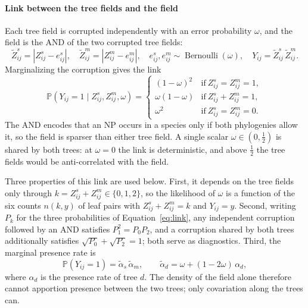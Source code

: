 \documentclass[
11pt, %
oneside, %
english, %
singlespacing, %
headsepline, %
chapterinoneline, %
]{MastersDoctoralThesis} %
\DeclareMathOperator{\Bernoulli}{Bernoulli}
\def\P{\mathbb{P}}
\begin{document}
\paragraph{Link between the tree fields and the field} Each tree field is corrupted independently with an error probability $\omega$, and the field is the AND of the two corrupted tree fields:
\begin{equation*}
	\tilde Z^s_{ij} = |Z^s_{ij} - e^s_{ij}|,\quad \tilde Z^m_{ij} = |Z^m_{ij} - e^m_{ij}|,\quad e^s_{ij}, e^m_{ij} \sim \Bernoulli(\omega),\quad Y_{ij} = \tilde Z^s_{ij}\, \tilde Z^m_{ij}.
\end{equation*}
Marginalizing the corruption gives the link
\begin{equation}
	\label{eq:link}
	\P(Y_{ij}=1 \mid Z^s_{ij}, Z^m_{ij}, \omega) =
	\begin{cases}
		(1-\omega)^2      & \mathrm{if\ } Z^s_{ij} = Z^m_{ij} = 1, \\
		\omega(1-\omega)  & \mathrm{if\ } Z^s_{ij} + Z^m_{ij} = 1, \\
		\omega^2          & \mathrm{if\ } Z^s_{ij} = Z^m_{ij} = 0.
	\end{cases}
\end{equation}
The AND encodes that an NP occurs in a species only if both phylogenies allow it, so the field is sparser than either tree field. A single scalar $\omega \in (0, \tfrac12)$ is shared by both trees: at $\omega=0$ the link is deterministic, and above $\tfrac12$ the tree fields would be anti-correlated with the field.

Three properties of this link are used below. First, it depends on the tree fields only through $k = Z^s_{ij} + Z^m_{ij} \in \{0,1,2\}$, so the likelihood of $\omega$ is a function of the six counts $n(k,y)$ of leaf pairs with $Z^s_{ij} + Z^m_{ij} = k$ and $Y_{ij} = y$. Second, writing $P_k$ for the three probabilities of Equation~\eqref{eq:link}, any independent corruption followed by an AND satisfies $P_1^2 = P_0 P_2$, and a corruption shared by both trees additionally satisfies $\sqrt{P_0} + \sqrt{P_2} = 1$; both serve as diagnostics. Third, the marginal presence rate is
\begin{equation*}
	\P(Y_{ij} = 1) = \tilde\alpha_s\, \tilde\alpha_m, \qquad \tilde\alpha_d = \omega + (1-2\omega)\, \alpha_d,
\end{equation*}
where $\alpha_d$ is the presence rate of tree $d$. The density of the field alone therefore cannot apportion presence between the two trees; only covariation along the trees can.
\end{document}
